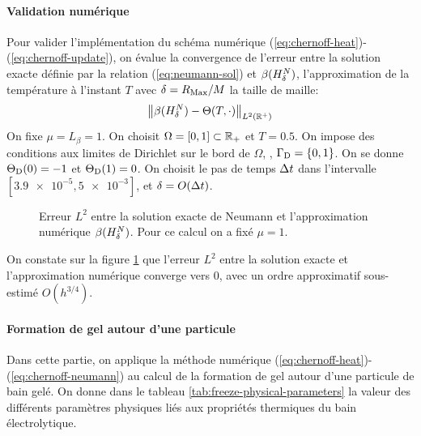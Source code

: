 \paragraph{Validation numérique}
Pour valider l'implémentation du schéma numérique
(\ref{eq:chernoff-heat})-(\ref{eq:chernoff-update}), on évalue la
convergence de l'erreur entre la solution exacte définie par la
relation (\ref{eq:neumann-sol}) et $\beta(H^N_\delta)$,
l'approximation de la température à l'instant $T$ avec $\delta =
R_\mathrm{Max}/M$ la taille de maille:
\begin{equation}
\left\lVert \beta(H^N_\delta) - \Theta(T, \cdot) \right\rVert_{L^2(\mathbb R^+)}
\end{equation}
On fixe $\mu = L_\beta =
1$. On choisit $\Omega = [0, 1] \subset \mathbb R_+$ et $T = 0.5$. On
impose des conditions aux limites de Dirichlet sur le bord de
$\Omega$, \ie, $\Gamma_\mathrm{D} = \left\{ 0, 1 \right\}$. On se donne
$\Theta_\mathrm{D}(0) = -1$ et $\Theta_\mathrm{D}(1) =
0$. On choisit le pas de temps $\Delta t$ dans l'intervalle
$[\num{3.9e-5}, \num{5e-3}]$, et $\delta = O(\Delta t)$.

\begin{figure}[h]
  \begin{center}
    
    \caption{Erreur $L^2$ entre la solution exacte de Neumann et
      l'approximation numérique $\beta(H^N_\delta)$. Pour ce
      calcul on a fixé $\mu = 1$.}
    \label{fig:neumann-convergence}
  \end{center}
\end{figure}

On constate sur la figure \ref{fig:neumann-convergence} que l'erreur
$L^2$ entre la solution exacte et l'approximation numérique converge
vers 0, avec un ordre approximatif sous-estimé  $O(h^{3/4})$.


\paragraph{Formation de gel autour d'une particule}
Dans cette partie, on applique la méthode numérique
(\ref{eq:chernoff-heat})-(\ref{eq:chernoff-neumann}) au calcul de la
formation de gel autour d'une particule de bain gelé.  On donne dans
le tableau \ref{tab:freeze-physical-parameters} la valeur des
différents paramètres physiques liés aux propriétés thermiques du bain
électrolytique.

